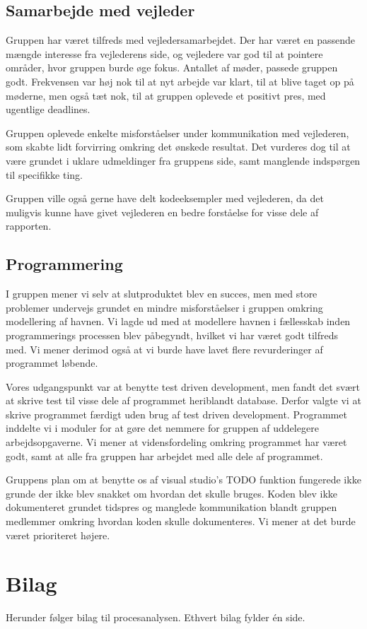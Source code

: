 \documentclass[a4paper,12pt,oneside]{article}
\begin{document}
\subsection{Samarbejde med vejleder}

Gruppen har været tilfreds med vejledersamarbejdet. Der har været en passende mængde interesse fra vejlederens side, og vejledere var god til at pointere områder, hvor gruppen burde øge fokus. Antallet af møder, passede gruppen godt. Frekvensen var høj nok til at nyt arbejde var klart, til at blive taget op på møderne, men også tæt nok, til at gruppen oplevede et positivt pres, med ugentlige deadlines.

Gruppen oplevede enkelte misforståelser under kommunikation med vejlederen, som skabte lidt forvirring omkring det ønskede resultat. Det vurderes dog til at være grundet i uklare udmeldinger fra gruppens side, samt manglende indspørgen til specifikke ting.

Gruppen ville også gerne have delt kodeeksempler med vejlederen, da det muligvis kunne have givet vejlederen en bedre forståelse for visse dele af rapporten.

\subsection{Programmering} 

I gruppen mener vi selv at slutproduktet blev en succes, men med store problemer undervejs grundet en mindre misforståelser i gruppen omkring modellering af havnen. Vi lagde ud med at modellere havnen i fællesskab inden programmerings processen blev påbegyndt, hvilket vi har været godt tilfreds med. Vi mener derimod også at vi burde have lavet flere revurderinger af programmet løbende.

Vores udgangspunkt var at benytte test driven development, men fandt det svært at skrive test til visse dele af programmet heriblandt database. Derfor valgte vi at skrive programmet færdigt uden brug af test driven development. Programmet inddelte vi i moduler for at gøre det nemmere for gruppen af uddelegere arbejdsopgaverne. Vi mener at vidensfordeling omkring programmet har været godt, samt at alle fra gruppen har arbejdet med alle dele af programmet. 

Gruppens plan om at benytte os af visual studio's TODO funktion fungerede ikke grunde der ikke blev snakket om hvordan det skulle bruges. Koden blev ikke dokumenteret grundet tidspres og manglede kommunikation blandt gruppen medlemmer omkring hvordan koden skulle dokumenteres. Vi mener at det burde været prioriteret højere.


\section{Bilag} 
\label{sec:bilag}

Herunder følger bilag til procesanalysen. Ethvert bilag fylder én side.



\label{trello}

\label{samarbejdsaftale}

\label{vejledersamarbejde}

\end{document}
